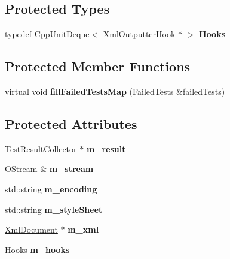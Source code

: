 \subsection*{Protected Types}
\begin{DoxyCompactItemize}
\item 
typedef Cpp\+Unit\+Deque$<$ \hyperlink{class_xml_outputter_hook}{Xml\+Outputter\+Hook} $\ast$ $>$ {\bfseries Hooks}\hypertarget{class_xml_outputter_a721fa60bda8d779457ae8e429be21d74}{}\label{class_xml_outputter_a721fa60bda8d779457ae8e429be21d74}

\end{DoxyCompactItemize}
\subsection*{Protected Member Functions}
\begin{DoxyCompactItemize}
\item 
virtual void {\bfseries fill\+Failed\+Tests\+Map} (Failed\+Tests \&failed\+Tests)\hypertarget{class_xml_outputter_a063afe5aaec2936d53ba58c45b5bdb54}{}\label{class_xml_outputter_a063afe5aaec2936d53ba58c45b5bdb54}

\end{DoxyCompactItemize}
\subsection*{Protected Attributes}
\begin{DoxyCompactItemize}
\item 
\hyperlink{class_test_result_collector}{Test\+Result\+Collector} $\ast$ {\bfseries m\+\_\+result}\hypertarget{class_xml_outputter_a982002691814b46b0fe8ca79a74d8895}{}\label{class_xml_outputter_a982002691814b46b0fe8ca79a74d8895}

\item 
O\+Stream \& {\bfseries m\+\_\+stream}\hypertarget{class_xml_outputter_a6f7eb773760301d381ba7f3ca5729bca}{}\label{class_xml_outputter_a6f7eb773760301d381ba7f3ca5729bca}

\item 
std\+::string {\bfseries m\+\_\+encoding}\hypertarget{class_xml_outputter_a193e314a66971eec760045fc20e5a2d1}{}\label{class_xml_outputter_a193e314a66971eec760045fc20e5a2d1}

\item 
std\+::string {\bfseries m\+\_\+style\+Sheet}\hypertarget{class_xml_outputter_a83e00800a42c2a62127e335f28b58230}{}\label{class_xml_outputter_a83e00800a42c2a62127e335f28b58230}

\item 
\hyperlink{class_xml_document}{Xml\+Document} $\ast$ {\bfseries m\+\_\+xml}\hypertarget{class_xml_outputter_a7c789c60c2031edc2527e75e736612cb}{}\label{class_xml_outputter_a7c789c60c2031edc2527e75e736612cb}

\item 
Hooks {\bfseries m\+\_\+hooks}\hypertarget{class_xml_outputter_a54643e72aed488db22338cb878be2c81}{}\label{class_xml_outputter_a54643e72aed488db22338cb878be2c81}

\end{DoxyCompactItemize}
